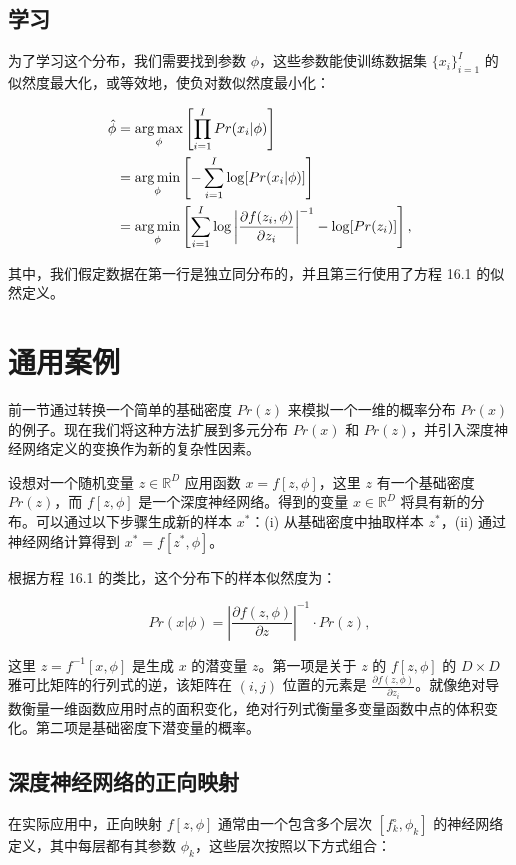 \subsection{学习}

为了学习这个分布，我们需要找到参数 \(\phi\)，这些参数能使训练数据集 \(\{x_i\}_{i=1}^I\) 的似然度最大化，或等效地，使负对数似然度最小化：


\begin{align}
\hat{\phi} &= \underset{\phi}{\arg\max} \left[ \prod_{i=1}^I Pr(x_i|\phi) \right] \notag \\
&= \underset{\phi}{\arg\min} \left[ -\sum_{i=1}^I \log[Pr(x_i|\phi)] \right] \notag \\
&= \underset{\phi}{\arg\min} \left[ \sum_{i=1}^I \log \left| \frac{\partial f(z_i, \phi)}{\partial z_i} \right|^{-1} - \log[Pr(z_i)] \right], 
\end{align} 


其中，我们假定数据在第一行是独立同分布的，并且第三行使用了方程 16.1 的似然定义。


\section{通用案例}
前一节通过转换一个简单的基础密度 \(Pr(z)\) 来模拟一个一维的概率分布 \(Pr(x)\) 的例子。现在我们将这种方法扩展到多元分布 \(Pr(x)\) 和 \(Pr(z)\)，并引入深度神经网络定义的变换作为新的复杂性因素。

设想对一个随机变量 \(z \in \mathbb{R}^D\) 应用函数 \(x = f[z, \phi]\)，这里 \(z\) 有一个基础密度 \(Pr(z)\)，而 \(f[z, \phi]\) 是一个深度神经网络。得到的变量 \(x \in \mathbb{R}^D\) 将具有新的分布。可以通过以下步骤生成新的样本 \(x^*\)：(i) 从基础密度中抽取样本 \(z^*\)，(ii) 通过神经网络计算得到 \(x^* = f[z^*, \phi]\)。

根据方程 16.1 的类比，这个分布下的样本似然度为：

\begin{equation}
Pr(x|\phi) = \left| \frac{\partial f(z, \phi)}{\partial z} \right|^{-1} \cdot Pr(z), 
\end{equation}

这里 \(z = f^{-1}[x, \phi]\) 是生成 \(x\) 的潜变量 \(z\)。第一项是关于 \(z\) 的 \(f[z, \phi]\) 的 \(D \times D\) 雅可比矩阵的行列式的逆，该矩阵在 \((i, j)\) 位置的元素是 \(\frac{\partial f(z, \phi)}{\partial z_i}\)。就像绝对导数衡量一维函数应用时点的面积变化，绝对行列式衡量多变量函数中点的体积变化。第二项是基础密度下潜变量的概率。

\subsection{深度神经网络的正向映射}
在实际应用中，正向映射 \(f[z, \phi]\) 通常由一个包含多个层次 \([f_k^{\circ}, \phi_k]\) 的神经网络定义，其中每层都有其参数 \(\phi_k\)，这些层次按照以下方式组合：

